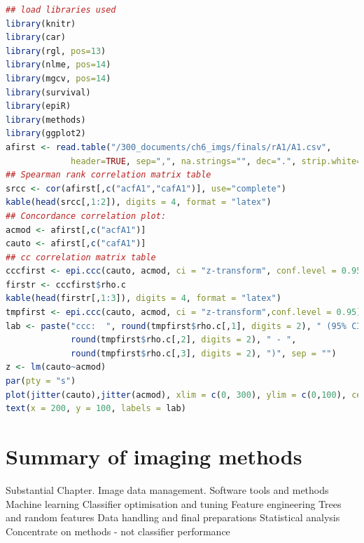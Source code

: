 \begin{lstlisting}[float, language=r, caption={[R-studio concordance correlation script.]R-studio concordance correlation script for automatic counts by thresholding and the CF classifier.}, label=cd:rstudio]
## load libraries used
library(knitr)
library(car)
library(rgl, pos=13)
library(nlme, pos=14)
library(mgcv, pos=14)
library(survival)
library(epiR)
library(methods)
library(ggplot2)
afirst <- read.table("/300_documents/ch6_imgs/finals/rA1/A1.csv", 
             header=TRUE, sep=",", na.strings="", dec=".", strip.white=TRUE)
## Spearman rank correlation matrix table
srcc <- cor(afirst[,c("acfA1","cafA1")], use="complete")
kable(head(srcc[,1:2]), digits = 4, format = "latex")
## Concordance correlation plot:
acmod <- afirst[,c("acfA1")]
cauto <- afirst[,c("cafA1")]
## cc correlation matrix table
cccfirst <- epi.ccc(cauto, acmod, ci = "z-transform", conf.level = 0.95)
firstr <- cccfirst$rho.c
kable(head(firstr[,1:3]), digits = 4, format = "latex")
tmpfirst <- epi.ccc(cauto, acmod, ci = "z-transform",conf.level = 0.95)
lab <- paste("ccc:  ", round(tmpfirst$rho.c[,1], digits = 2), " (95% CI ", 
             round(tmpfirst$rho.c[,2], digits = 2), " - ",
             round(tmpfirst$rho.c[,3], digits = 2), ")", sep = "")
z <- lm(cauto~acmod)
par(pty = "s")
plot(jitter(cauto),jitter(acmod), xlim = c(0, 300), ylim = c(0,100), cex=1, xlab = "Automatic counts by threshold", ylab = "Automatic counts by CF model", pch = 1) abline(a = 0, b = 1, lty = 2) abline(z, lty = 1)
text(x = 200, y = 100, labels = lab)
\end{lstlisting}

\section{Summary of imaging methods}\label{sec:summary-of-imaging-methods}
Substantial Chapter.
Image data management.
Software tools and methods
Machine learning 
Classifier optimisation and tuning
Feature engineering
Trees and random features
Data handling and final preparations
Statistical analysis
Concentrate on methods - not classifier performance
